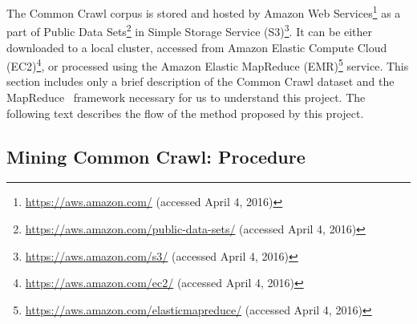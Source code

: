 The Common Crawl corpus is stored and hosted by Amazon Web Services\footnote{\url{https://aws.amazon.com/} (accessed April 4, 2016)} as a part of Public Data Sets\footnote{\url{https://aws.amazon.com/public-data-sets/} (accessed April 4, 2016)} in Simple Storage Service (S3)\footnote{\url{https://aws.amazon.com/s3/} (accessed April 4, 2016)}. It can be either downloaded to a local cluster, accessed from Amazon Elastic Compute Cloud (EC2)\footnote{\url{https://aws.amazon.com/ec2/} (accessed April 4, 2016)}, or processed using the Amazon Elastic MapReduce (EMR)\footnote{\url{https://aws.amazon.com/elasticmapreduce/} (accessed April 4, 2016)} service. This section includes only a brief description of the Common Crawl dataset and the MapReduce~\cite{Dean04} framework necessary for us to understand this project. The following text describes the flow of the method proposed by this project.

\subsection{Mining Common Crawl: Procedure}
\label{subsection:mining_common_crawl_procedure}

